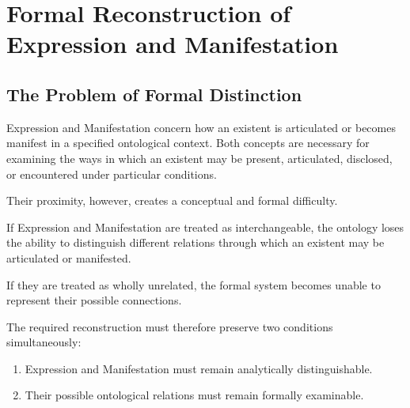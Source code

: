 %
%
%
%

\section{Formal Reconstruction of Expression and Manifestation}
\label{sec:formal-reconstruction-of-expression-and-manifestation}

\subsection{The Problem of Formal Distinction}

Expression and Manifestation concern how an existent
is articulated or becomes manifest in a specified
ontological context. Both concepts are necessary
for examining the ways in which an existent may
be present, articulated, disclosed, or encountered
under particular conditions.

Their proximity, however, creates a conceptual
and formal difficulty.

If Expression and Manifestation are treated as
interchangeable, the ontology loses the ability
to distinguish different relations through which
an existent may be articulated or manifested.

If they are treated as wholly unrelated, the
formal system becomes unable to represent
their possible connections.

The required reconstruction must therefore
preserve two conditions simultaneously:

\begin{enumerate}
    \item Expression and Manifestation must
    remain analytically distinguishable.
    \item Their possible ontological relations
    must remain formally examinable.
\end{enumerate}

